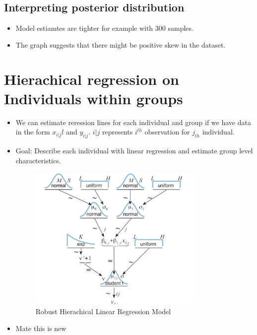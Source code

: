 \documentclass[a4paper]{article}
\begin{document}
\subsection{Interpreting posterior distribution}
\begin{itemize}
    \item Model estiamtes are tighter for example with 300 samples.
    \item The graph suggests that there might be positive skew in the dataset.
\end{itemize}
\section{Hierachical regression on Individuals within groups}
\begin{itemize}
    \item We can estimate reression lines for each individual and group if we have data in the form $x_{i|j}l$ and $y_{i|j}$. $i|j$ represents  $i^{th}$ observation for  $j_{th}$ individual.
    \item Goal: Describe each individual with linear regression and estimate group level characteristics.
    \begin{figure}[H]
        \centering
        \includegraphics[width=0.8\textwidth]{robust_hierachical_linear_regression}
        \caption{Robust Hierachical Linear Regression Model}
        \label{fig:robust_hierachical_linear_regression}
    \end{figure} 
    \item Mate this is new
\end{itemize}
\end{document}
